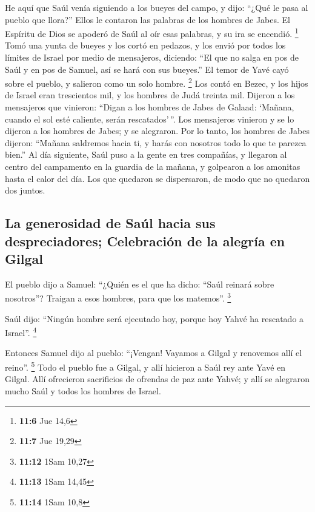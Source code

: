  He aquí que Saúl venía siguiendo a los bueyes del campo,
y dijo: ``¿Qué le pasa al pueblo que llora?'' Ellos le contaron las
palabras de los hombres de Jabes.  El Espíritu de Dios se
apoderó de Saúl al oír esas palabras, y su ira se encendió. \footnote{\textbf{11:6}
  Jue 14,6}  Tomó una yunta de bueyes y los cortó en
pedazos, y los envió por todos los límites de Israel por medio de
mensajeros, diciendo: ``El que no salga en pos de Saúl y en pos de
Samuel, así se hará con sus bueyes.'' El temor de Yavé cayó sobre el
pueblo, y salieron como un solo hombre. \footnote{\textbf{11:7} Jue
  19,29}  Los contó en Bezec, y los hijos de Israel eran
trescientos mil, y los hombres de Judá treinta mil. 
Dijeron a los mensajeros que vinieron: ``Digan a los hombres de Jabes de
Galaad: `Mañana, cuando el sol esté caliente, serán rescatados'\,''. Los
mensajeros vinieron y se lo dijeron a los hombres de Jabes; y se
alegraron.  Por lo tanto, los hombres de Jabes dijeron:
``Mañana saldremos hacia ti, y harás con nosotros todo lo que te parezca
bien.''  Al día siguiente, Saúl puso a la gente en tres
compañías, y llegaron al centro del campamento en la guardia de la
mañana, y golpearon a los amonitas hasta el calor del día. Los que
quedaron se dispersaron, de modo que no quedaron dos juntos.

\hypertarget{la-generosidad-de-sauxfal-hacia-sus-despreciadores-celebraciuxf3n-de-la-alegruxeda-en-gilgal}{%
\subsection{La generosidad de Saúl hacia sus despreciadores; Celebración
de la alegría en
Gilgal}\label{la-generosidad-de-sauxfal-hacia-sus-despreciadores-celebraciuxf3n-de-la-alegruxeda-en-gilgal}}

 El pueblo dijo a Samuel: ``¿Quién es el que ha dicho:
``Saúl reinará sobre nosotros''? Traigan a esos hombres, para que los
matemos''. \footnote{\textbf{11:12} 1Sam 10,27}

 Saúl dijo: ``Ningún hombre será ejecutado hoy, porque
hoy Yahvé ha rescatado a Israel''. \footnote{\textbf{11:13} 1Sam 14,45}

 Entonces Samuel dijo al pueblo: ``¡Vengan! Vayamos a
Gilgal y renovemos allí el reino''. \footnote{\textbf{11:14} 1Sam 10,8}
 Todo el pueblo fue a Gilgal, y allí hicieron a Saúl rey
ante Yavé en Gilgal. Allí ofrecieron sacrificios de ofrendas de paz ante
Yahvé; y allí se alegraron mucho Saúl y todos los hombres de Israel.

